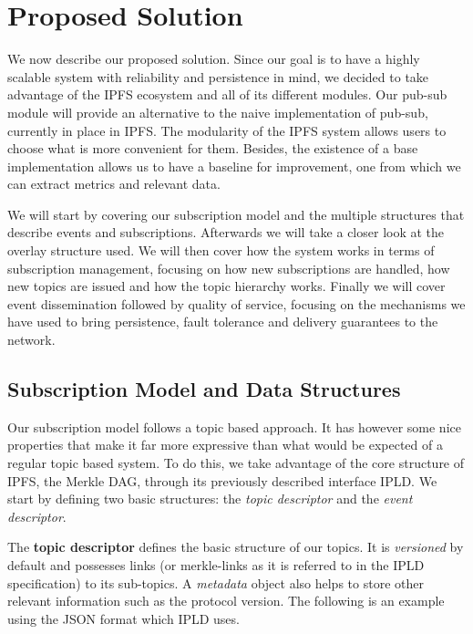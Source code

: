 
%
%

\section{Proposed Solution}

We now describe our proposed solution. Since our goal is to have a
highly scalable system with reliability and persistence in mind, we
decided to take advantage of the IPFS ecosystem and all of its different
modules. Our pub-sub module will provide an alternative to the naive
implementation of pub-sub, currently in place in IPFS. The modularity of
the IPFS system allows users to choose what is more convenient for them.
Besides, the existence of a base implementation allows us to have a
baseline for improvement, one from which we can extract metrics and
relevant data.

We will start by covering our subscription model and the multiple
structures that describe events and subscriptions. Afterwards we will
take a closer look at the overlay structure used. We will then cover how
the system works in terms of subscription management, focusing on how
new subscriptions are handled, how new topics are issued and how the
topic hierarchy works. Finally we will cover event dissemination
followed by quality of service, focusing on the mechanisms we have used
to bring persistence, fault tolerance and delivery guarantees to the
network.

\subsection{Subscription Model and Data
Structures}\label{subscription-model-and-data-structures}

Our subscription model follows a topic based approach. It has however
some nice properties that make it far more expressive than what would be
expected of a regular topic based system. To do this, we take advantage
of the core structure of IPFS, the Merkle DAG, through its previously
described interface IPLD. We start by defining two basic structures: the
\emph{topic descriptor} and the \emph{event descriptor}.

The \textbf{topic descriptor} defines the basic structure of our topics.
It is \emph{versioned} by default and possesses links (or merkle-links
as it is referred to in the IPLD specification) to its sub-topics. A
\emph{metadata} object also helps to store other relevant information
such as the protocol version. The following is an example using the JSON
format which IPLD uses.


